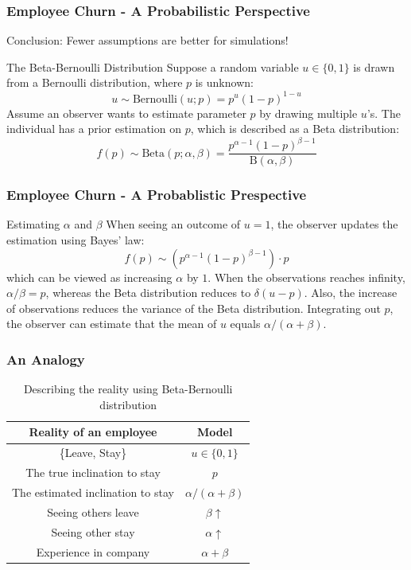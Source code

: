 \documentclass{beamer}
\begin{document}
\begin{frame}
\frametitle{Employee Churn - A Probabilistic Perspective}
Conclusion: Fewer assumptions are better for simulations!
\begin{block}{The Beta-Bernoulli Distribution}
Suppose a random variable $u\in \{0,1\}$ is drawn from a Bernoulli distribution, where $p$ is unknown:
\begin{equation}
u \sim \mathrm{Bernoulli}(u;p)=p^u(1-p)^{1-u}
\end{equation}
Assume an observer wants to estimate parameter $p$ by drawing multiple $u$'s. The individual has a prior estimation on $p$, which is described as a Beta distribution:
\begin{equation}
f(p)\sim \mathrm{Beta}(p;\alpha, \beta) = \frac{p^{\alpha-1}(1-p)^{\beta-1}}{\mathrm{B}(\alpha, \beta)}
\end{equation}
\end{block}
\end{frame}

\begin{frame}
\frametitle{Employee Churn - A Probablistic Prespective}
\begin{block}{Estimating $\alpha$ and $\beta$}
When seeing an outcome of $u=1$, the observer updates the estimation using Bayes' law:
\begin{equation}
f(p)\sim (p^{\alpha - 1}(1-p)^{\beta-1})\cdot p
\end{equation}
which can be viewed as increasing $\alpha$ by $1$. When the observations reaches infinity, $\alpha/\beta=p$, whereas the Beta distribution reduces to $\delta(u-p)$. Also, the increase of observations reduces the variance of the Beta distribution. Integrating out $p$, the observer can estimate that the mean of $u$ equals $\alpha/(\alpha+\beta)$.

\end{block}
\end{frame}

\begin{frame}
\frametitle{An Analogy}
\begin{table}
\centering
\begin{tabular}{|c|c|}
\hline
Reality of an employee             &  Model \\\hline
\{Leave, Stay\}                    &  $u\in \{0, 1\}$\\
The true inclination to stay       &  $p$ \\
The estimated inclination to stay  & $\alpha/(\alpha+\beta)$ \\
Seeing others leave                & $\beta \uparrow$ \\
Seeing other stay                  & $\alpha \uparrow$ \\
Experience in company              & $\alpha + \beta$ \\
\hline
\end{tabular}
\caption{Describing the reality using Beta-Bernoulli distribution}
\end{table}
\end{frame}
\end{document}
